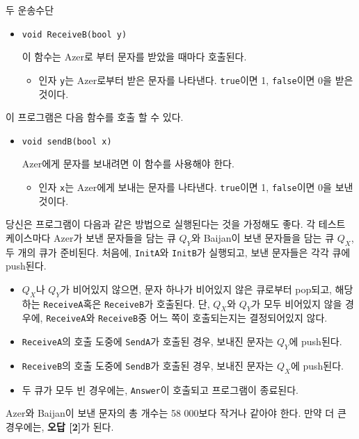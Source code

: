 \begin{problem}{두 운송수단}
\begin{itemize}
		\item \texttt{void ReceiveB(bool y)}
		
		이 함수는 Azer로 부터 문자를 받았을 때마다 호출된다.
		\begin{itemize}
			\item 인자 \texttt{y}는 Azer로부터 받은 문자를 나타낸다. \texttt{true}이면 1, \texttt{false}이면 0을 받은 것이다.
		\end{itemize}
		
	\end{itemize}
	
	이 프로그램은 다음 함수를 호출 할 수 있다.
	
	\begin{itemize}
		\item \texttt{void sendB(bool x)}
		
		Azer에게 문자를 보내려면 이 함수를 사용해야 한다.
		
		\begin{itemize}
			\item 인자 \texttt{x}는 Azer에게 보내는 문자를 나타낸다. \texttt{true}이면 1, \texttt{false}이면 0을 보낸 것이다.
		\end{itemize}
		
	\end{itemize}
		
	
	당신은 프로그램이 다음과 같은 방법으로 실행된다는 것을 가정해도 좋다. 각 테스트 케이스마다 Azer가 보낸 문자들을 담는 큐 $Q_Y$와 Baijan이 보낸 문자들을 담는 큐 $Q_X$, 두 개의 큐가 준비된다.
	처음에, \texttt{InitA}와 \texttt{InitB}가 실행되고, 보낸 문자들은 각각 큐에 push된다.
	
	\begin{itemize}
		\item $Q_X$나 $Q_Y$가 비어있지 않으면, 문자 하나가 비어있지 않은 큐로부터 pop되고, 해당하는 \texttt{ReceiveA}혹은 \texttt{ReceiveB}가 호출된다. 단, $Q_X$와 $Q_Y$가 모두 비어있지 않을 경우에, \texttt{ReceiveA}와 \texttt{ReceiveB}중 어느 쪽이 호출되는지는 결정되어있지 않다.
		\item \texttt{ReceiveA}의 호출 도중에 \texttt{SendA}가 호출된 경우, 보내진 문자는 $Q_Y$에 push된다.
		\item \texttt{ReceiveB}의 호출 도중에 \texttt{SendB}가 호출된 경우, 보내진 문자는 $Q_X$에 push된다.
		\item 두 큐가 모두 빈 경우에는, \texttt{Answer}이 호출되고 프로그램이 종료된다.
	\end{itemize}
	
	Azer와 Baijan이 보낸 문자의 총 개수는 58 000보다 작거나 같아야 한다. 만약 더 큰 경우에는, \textbf{오답 [2]}가 된다.
	

\end{problem}
